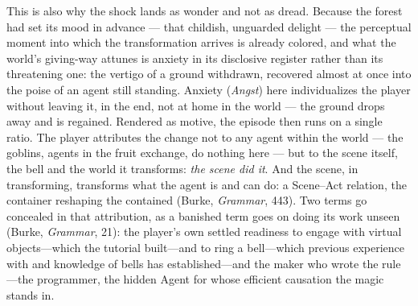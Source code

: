 \documentclass{article}
\begin{document}
This is also why the shock lands as wonder and not as dread. Because the forest had set its mood in advance — that childish, unguarded delight — the perceptual moment into which the transformation arrives is already colored, and what the world's giving-way attunes is anxiety in its disclosive register rather than its threatening one: the vertigo of a ground withdrawn, recovered almost at once into the poise of an agent still standing. Anxiety (\textit{Angst}) here individualizes the player without leaving it, in the end, not at home in the world — the ground drops away and is regained. Rendered as motive, the episode then runs on a single ratio. The player attributes the change not to any agent within the world — the goblins, agents in the fruit exchange, do nothing here — but to the scene itself, the bell and the world it transforms: \textit{the scene did it}. And the scene, in transforming, transforms what the agent is and can do: a Scene--Act relation, the container reshaping the contained (Burke, \textit{Grammar}, 443). Two terms go concealed in that attribution, as a banished term goes on doing its work unseen (Burke, \textit{Grammar}, 21): the player's own settled readiness to engage with virtual objects---which the tutorial built---and to ring a bell---which previous experience with and knowledge of bells has established---and the maker who wrote the rule---the programmer, the hidden Agent for whose efficient causation the magic stands in.
\end{document}
